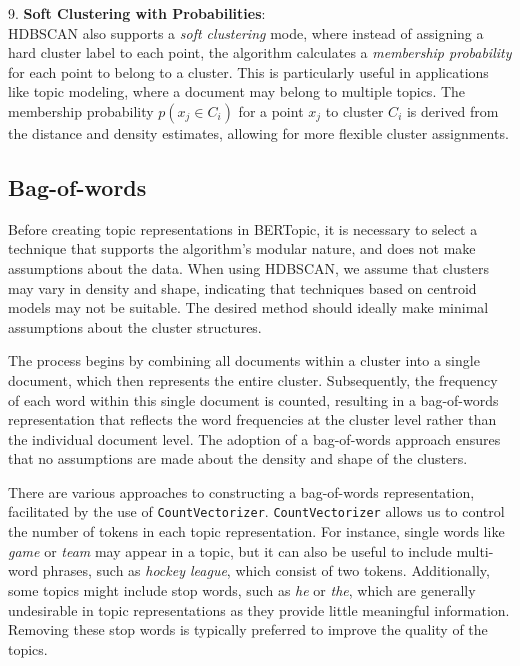 9. \textbf{Soft Clustering with Probabilities}: \\
HDBSCAN also supports a \textit{soft clustering} mode, where instead of assigning a hard cluster label to each point, the algorithm calculates a \textit{membership probability} for each point to belong to a cluster. This is particularly useful in applications like topic modeling, where a document may belong to multiple topics. The membership probability $p(x_j \in C_i)$ for a point $x_j$ to cluster $C_i$ is derived from the distance and density estimates, allowing for more flexible cluster assignments.

\subsection{Bag-of-words}
\label{sec:bag_of_words}

Before creating topic representations in BERTopic, it is necessary to select a technique that supports the algorithm's modular nature, and does not make assumptions about the data. When using HDBSCAN, we assume that clusters may vary in density and shape, indicating that techniques based on centroid models may not be suitable. The desired method should ideally make minimal assumptions about the cluster structures.

The process begins by combining all documents within a cluster into a single document, which then represents the entire cluster. Subsequently, the frequency of each word within this single document is counted, resulting in a bag-of-words representation that reflects the word frequencies at the cluster level rather than the individual document level. The adoption of a bag-of-words approach ensures that no assumptions are made about the density and shape of the clusters.

There are various approaches to constructing a bag-of-words representation, facilitated by the use of \texttt{CountVectorizer}. \texttt{CountVectorizer} allows us to control the number of tokens in each topic representation. For instance, single words like \textit{game} or \textit{team} may appear in a topic, but it can also be useful to include multi-word phrases, such as \textit{hockey league}, which consist of two tokens. Additionally, some topics might include stop words, such as \textit{he} or \textit{the}, which are generally undesirable in topic representations as they provide little meaningful information. Removing these stop words is typically preferred to improve the quality of the topics.

